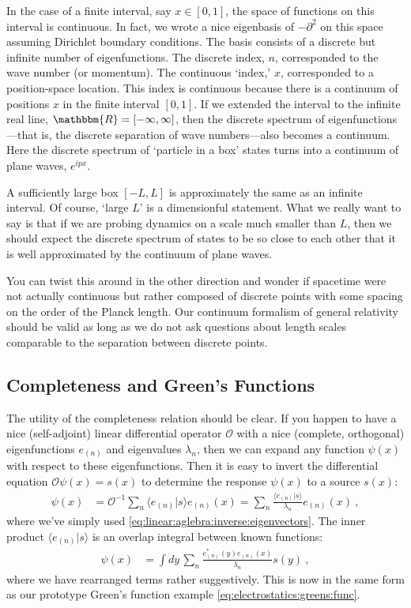 \begin{example}
In the case of a finite interval, say $x\in [0,1]$, the space of functions on this interval is continuous. In fact, we wrote a nice eigenbasis of $-\partial^2$ on this space assuming Dirichlet boundary conditions. The basis consists of a discrete but infinite number of eigenfunctions. The discrete index, $n$, corresponded to the wave number (or momentum). The continuous `index,' $x$, corresponded to a position-space location. This index is continuous because there is a continuum of positions $x$ in the finite interval $[0,1]$. If we extended the interval to the infinite real line, $\mathbbm{R} = [-\infty, \infty]$, then the discrete spectrum of eigenfunctions---that is, the discrete separation of wave numbers---also becomes a continuum. Here the discrete spectrum of `particle in a box' states turns into a continuum of plane waves, $e^{ipx}$. 

A sufficiently large box $[-L,L]$ is approximately the same as an infinite interval. Of course, `large $L$' is a dimensionful statement. What we really want to say is that if we are probing dynamics on a scale much smaller than $L$, then we should expect the discrete spectrum of states to be so close to each other that it is well approximated by the continuum of plane waves. 

You can twist this around in the other direction and wonder if spacetime were not actually continuous but rather composed of discrete points with some spacing on the order of the Planck length. Our continuum formalism of general relativity should be valid as long as we do not ask questions about length scales comparable to the separation between discrete points. 
\end{example}

\subsection{Completeness and Green's Functions}

The utility of the completeness relation should be clear. If you happen to have a nice (self-adjoint) linear differential operator $\mathcal O$ with a nice (complete, orthogonal) eigenfunctions $e_{(n)}$ and eigenvalues $\lambda_n$, then we can expand any function $\psi(x)$ with respect to these eigenfunctions. Then it is easy to invert the differential equation $\mathcal O \psi(x) = s(x)$ to determine the response $\psi(x)$ to a source $s(x)$:
\begin{align}
	\psi(x) 
	&= \mathcal O^{-1}
	\sum_n \langle e_{(n)}|s\rangle e_{(n)}(x)
	= \sum_n \frac{\langle e_{(n)}|s\rangle}{\lambda_n} e_{(n)}(x) \ ,
\end{align}
where we've simply used \eqref{eq:linear:aglebra:inverse:eigenvectors}. The inner product $\langle e_{(n)}|s\rangle$ is an overlap integral between known functions:
\begin{align}
	\psi(x) &= 
	 \int dy\, \sum_n \frac{e_{(n)}^*(y) e_{(n)}(x)}{\lambda_n} s(y) \ ,
	 \label{eq:Greens:function:by:completeness}
\end{align}
where we have rearranged terms rather suggestively. This is now in the same form as our prototype Green's function example \eqref{eq:electrostatics:greens:func}. 

